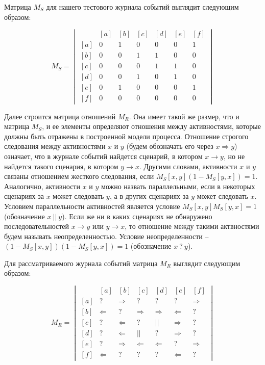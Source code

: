 \documentclass[
11pt,%
tightenlines,%
twoside,%
onecolumn,%
nofloats,%
nobibnotes,%
nofootinbib,%
superscriptaddress,%
noshowpacs,%
centertags]%
{revtex4}
\begin{document}
Матрица $M_S$ для нашего тестового журнала событий выглядит следующим образом:

\begin{equation}
M_S = \begin{vmatrix}
\ & [a] & [b] & [c] & [d] & [e] & [f] \\
[a] & 0 & 1 & 0 & 0 & 0 & 1 \\ 
[b] & 0 & 0 & 1 & 1 & 0 & 0 \\
[c] & 0 & 0 & 0 & 1 & 1 & 0 \\
[d] & 0 & 0 & 1 & 0 & 1 & 0 \\
[e] & 0 & 1 & 0 & 0 & 0 & 1 \\
[f] & 0 & 0 & 0 & 0 & 0 & 0
\end{vmatrix}
\end{equation}

Далее строится матрица отношений $M_R$.
Она имеет такой же размер, что и матрица $M_S$, и ее элементы определяют отношения между активностями, которые должны быть отражены в построенной модели процесса.
Отношение строгого следования между активностями $x$ и $y$ (будем обозначать его через $x \Rightarrow y$) означает, что в журнале событий найдется сценарий, в котором $x \rightarrow y$, но не найдется такого сценария, в котором $y \rightarrow x$.
Другими словами, активности $x$ и $y$ связаны отношением жесткого следования, если $M_S[x, y](1 - M_S[y, x]) = 1$.
Аналогично, активности $x$ и $y$ можно назвать параллельными, если в некоторых сценариях за $x$ может следовать $y$, а в других сценариях за $y$ может следовать $x$.
Условием параллельности активностей является условие $M_S[x, y]M_S[y, x] = 1$ (обозначение $x \ || \ y$).
Если же ни в каких сценариях не обнаружено последовательностей $x \rightarrow y$ или $y \rightarrow x$, то отношение между такими актвностями будем называть неопределенностью.
Условие неопределенности -- $(1 - M_S[x, y])(1 - M_S[y, x]) = 1$ (обозначение $x \ ? \ y$).

Для рассматриваемого журнала событий матрица $M_R$ выглядит следующим образом:

\begin{equation}\label{eqn:r}
M_R = \begin{vmatrix}
\ & [a] & [b] & [c] & [d] & [e] & [f] \\
[a] & ? & \Rightarrow & ? & ? & ? & \Rightarrow \\ 
[b] & \Leftarrow & ? & \Rightarrow & \Rightarrow & \Leftarrow & ? \\
[c] & ? & \Leftarrow & ? & || & \Rightarrow & ? \\
[d] & ? & \Leftarrow & || & ? & \Rightarrow & ? \\
[e] & ? & \Rightarrow & \Leftarrow & \Leftarrow & ? & \Rightarrow \\
[f] & \Leftarrow & ? & ? & ? & \Leftarrow & ?
\end{vmatrix}
\end{equation}
\end{document}
